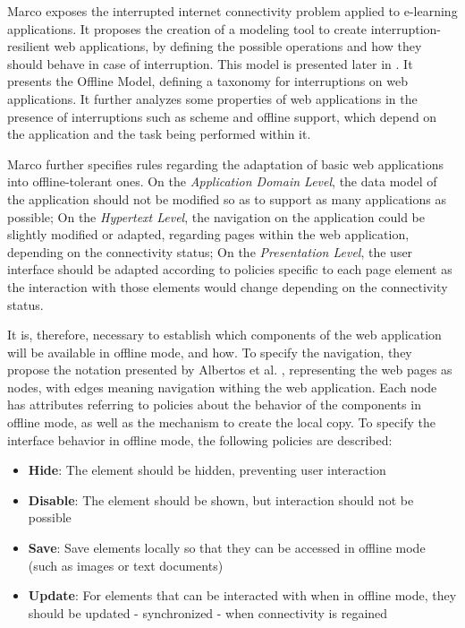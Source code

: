 Marco \cite{Marco2013} exposes the interrupted internet connectivity problem applied to e-learning applications. It proposes the creation of a modeling tool to create interruption-resilient web applications, by defining the possible operations and how they should behave in case of interruption. This model is presented later in \cite{Abertos-Marco2017}. It presents the Offline Model, defining a taxonomy for interruptions on web applications. It further analyzes some properties of web applications in the presence of interruptions such as scheme and offline support, which depend on the application and the task being performed within it.

Marco \cite{Marco2015} further specifies rules regarding the adaptation of basic web applications into offline-tolerant ones. On the \textit{Application Domain Level}, the data model of the application should not be modified so as to support as many applications as possible; On the \textit{Hypertext Level}, the navigation on the application could be slightly modified or adapted, regarding pages within the web application, depending on the connectivity status; On the \textit{Presentation Level}, the user interface should be adapted according to policies specific to each page element as the interaction with those elements would change depending on the connectivity status.

It is, therefore, necessary to establish which components of the web application will be available in offline mode, and how.
To specify the navigation, they propose the notation presented by Albertos et al. \cite{Penichet2013}, representing the web pages as nodes, with edges meaning navigation withing the web application. Each node has attributes referring to policies about the behavior of the components in offline mode, as well as the mechanism to create the local copy. To specify the interface behavior in offline mode, the following policies are described:

\begin{itemize}
    \item \textbf{Hide}: The element should be hidden, preventing user interaction
    \item \textbf{Disable}: The element should be shown, but interaction should not be possible
    \item \textbf{Save}: Save elements locally so that they can be accessed in offline mode (such as images or text documents)
    \item \textbf{Update}: For elements that can be interacted with when in offline mode, they should be updated - synchronized - when connectivity is regained
\end{itemize}

